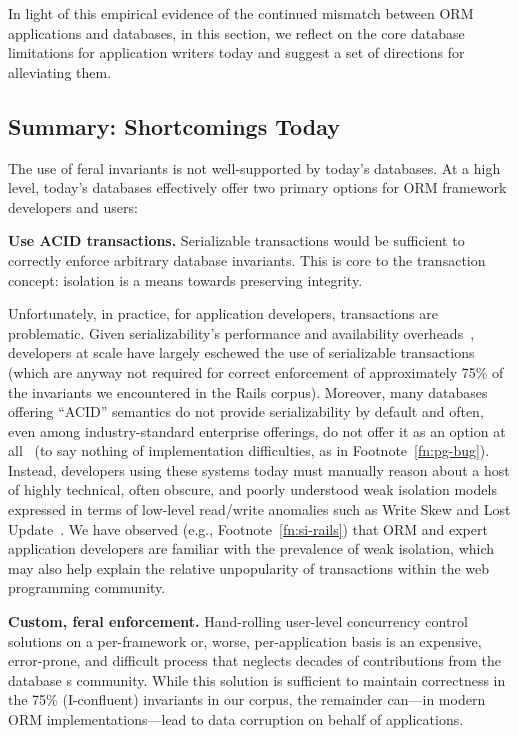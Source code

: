 In light of this empirical evidence of the continued mismatch between
ORM applications and databases, in this section, we reflect on the
core database limitations for application writers today and suggest a
set of directions for alleviating them.

\subsection{Summary: Shortcomings Today}

The use of feral invariants is not well-supported by today's
databases. At a high level, today's databases effectively offer two
primary options for ORM framework developers and users:

\begin{impenumerate}
\item \textbf{Use ACID transactions.} Serializable transactions would
  be sufficient to correctly enforce arbitrary database
  invariants. This is core to the transaction concept: isolation is a
  means towards preserving integrity. \vspace{.5em}

  Unfortunately, in practice, for application developers, transactions
  are problematic. Given serializability's performance and
  availability overheads~\cite{brewer-cap}, developers at scale have
  largely eschewed the use of serializable transactions (which are
  anyway not required for correct enforcement of approximately 75\% of
  the invariants we encountered in the Rails corpus). Moreover, many
  databases offering ``ACID'' semantics do not provide serializability
  by default and often, even among industry-standard enterprise
  offerings, do not offer it as an option at all~\cite{hat-vldb} (to
  say nothing of implementation difficulties, as in
  Footnote~\ref{fn:pg-bug}). Instead, developers using these systems
  today must manually reason about a host of highly technical, often
  obscure, and poorly understood weak isolation models expressed in
  terms of low-level read/write anomalies such as Write Skew and Lost
  Update~\cite{adya-isolation,consistency-borders}. We have observed
  (e.g., Footnote~\ref{fn:si-rails}) that ORM and expert application
  developers are familiar with the prevalence of weak isolation, which
  may also help explain the relative unpopularity of transactions
  within the web programming community.

\item\textbf{Custom, feral enforcement.} Hand-rolling
  user-level concurrency control solutions on a per-framework or,
  worse, per-application basis is an expensive, error-prone, and
  difficult process that neglects decades of contributions from the
  database s community. While this solution is sufficient to maintain
  correctness in the 75\% (I-confluent) invariants in our corpus, the
  remainder can---in modern ORM implementations---lead to data
  corruption on behalf of applications. \vspace{.5em}


\end{impenumerate}
